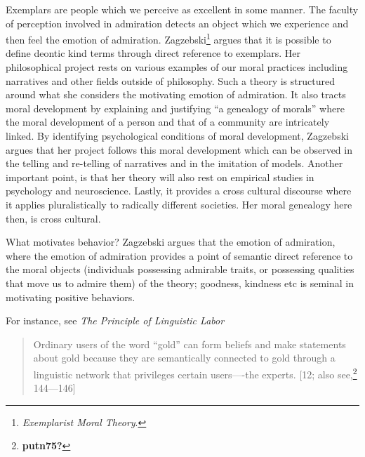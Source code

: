 \documentclass[phdthesis,12pt,final]{wuthesis}
\theoremstyle{definition}
\theoremstyle{definition}
\theoremstyle{definition}
\theoremstyle{definition}
\theoremstyle{remark}
\begin{document}
Exemplars are people which we perceive as excellent in some manner. The faculty of perception involved in admiration detects an object which we experience and then feel the emotion of admiration. Zagzebski\footnote{\emph{Exemplarist {Moral Theory}}.} argues that it is possible to define deontic kind terms through direct reference to exemplars. Her philosophical project rests on various examples of our moral practices including narratives and other fields outside of philosophy. Such a theory is structured around what she considers the motivating emotion of admiration. It also tracts moral development by explaining and justifying ``a genealogy of morals'' where the moral development of a person and that of a community are intricately linked. By identifying psychological conditions of moral development, Zagzebski argues that her project follows this moral development which can be observed in the telling and re-telling of narratives and in the imitation of models. Another important point, is that her theory will also rest on empirical studies in psychology and neuroscience. Lastly, it provides a cross cultural discourse where it applies pluralistically to radically different societies. Her moral genealogy here then, is cross cultural.

What motivates behavior? Zagzebski argues that the emotion of admiration, where the emotion of admiration provides a point of semantic direct reference to the moral objects (individuals possessing admirable traits, or possessing qualities that move us to admire them) of the theory; goodness, kindness etc is seminal in motivating positive behaviors.

For instance, see \emph{The Principle of Linguistic Labor}

\begin{quote}
Ordinary users of the word ``gold'' can form beliefs and make statements about gold because they are semantically connected to gold through a linguistic network that privileges certain users----the experts. {[}12; also see,\footnote{\textbf{putn75?}} 144---146{]}
\end{quote}
\end{document}
